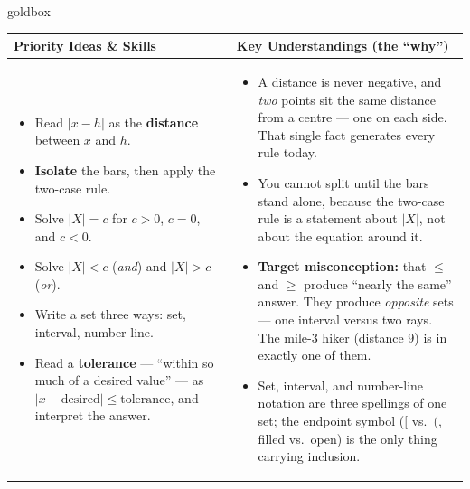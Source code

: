 \documentclass[10pt]{article}
\begin{document}
\renewcommand{\arraystretch}{1.4}
\boxguard
\begin{skillbox}{goldbox}
\begin{tabularx}{\linewidth}{@{}X|X@{}}
\textbf{Priority Ideas \& Skills} & \textbf{Key Understandings (the ``why'')} \\[2pt]
\hline
\vspace{-6pt}
\begin{itemize}[leftmargin=1.1em, nosep, after=\vspace{2pt}]
  \item Read $|x-h|$ as the \textbf{distance} between $x$ and $h$.
  \item \textbf{Isolate} the bars, then apply the two-case rule.
  \item Solve $|X|=c$ for $c>0$, $c=0$, and $c<0$.
  \item Solve $|X|<c$ (\emph{and}) and $|X|>c$ (\emph{or}).
  \item Write a set three ways: set, interval, number line.
  \item Read a \textbf{tolerance} --- ``within so much of a desired value'' --- as $|x-\text{desired}|\le\text{tolerance}$, and interpret the answer.
\end{itemize}
&
\vspace{-6pt}
\begin{itemize}[leftmargin=1.1em, nosep, after=\vspace{2pt}]
  \item A distance is never negative, and \emph{two} points sit the same distance from a
        centre --- one on each side. That single fact generates every rule today.
  \item You cannot split until the bars stand alone, because the two-case rule is a statement
        about $|X|$, not about the equation around it.
  \item \textbf{Target misconception:} that $\le$ and $\ge$ produce ``nearly the same'' answer.
        They produce \emph{opposite} sets --- one interval versus two rays. The mile-3 hiker
        (distance 9) is in exactly one of them.
  \item Set, interval, and number-line notation are three spellings of one set; the endpoint
        symbol ($[$ vs.\ $($, filled vs.\ open) is the only thing carrying inclusion.
\end{itemize}
\end{tabularx}
\end{skillbox}
\end{document}
